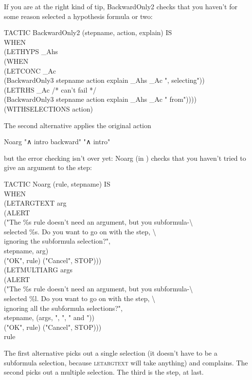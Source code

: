 If you are at the right kind of tip, BackwardOnly2 checks that you haven't for some reason selected a hypothesis formula or two:
\begin{japeish}
TACTIC BackwardOnly2 (stepname, action, explain) IS \\
\tab WHEN \\
\tab \tab (LETHYPS \_Ahs \\
\tab \tab \tab (WHEN  \\
\tab \tab \tab \tab (LETCONC \_Ac \\
\tab \tab \tab \tab \tab (BackwardOnly3 stepname action explain \_Ahs \_Ac ", selecting"))  \\
\tab \tab \tab \tab (LETRHS \_Ac  /* can't fail */  \\
\tab \tab \tab \tab \tab (BackwardOnly3 stepname action explain \_Ahs \_Ac " from"))))  \\
\tab \tab (WITHSELECTIONS action)
\end{japeish}
The second alternative applies the original action 
\begin{japeish}
Noarg "∧ intro backward" "∧ intro"
\end{japeish}
but the error checking isn't over yet: Noarg (in ) checks that you haven't tried to give an argument to the step:
\begin{japeish}
TACTIC Noarg (rule, stepname) IS \\
\tab WHEN \\
\tab \tab (LETARGTEXT arg \\
\tab \tab \tab (ALERT \\
\tab \tab \tab \tab ("The \%s rule doesn't need an argument, but you subformula-{\textbackslash}\\
\tab \tab \tab \tab {\textbackslash}selected  \%s. Do you want to go on with the step, {\textbackslash} \\
\tab \tab \tab \tab {\textbackslash}ignoring the subformula selection?",  \\
\tab \tab \tab \tab stepname, arg) \\
\tab \tab \tab \tab ("OK", rule) ("Cancel", STOP))) \\
\tab \tab (LETMULTIARG args \\
\tab \tab \tab (ALERT  \\
\tab \tab \tab \tab ("The \%s rule doesn't need an argument, but you subformula-{\textbackslash} \\
\tab \tab \tab \tab {\textbackslash}selected \%l. Do you want to go on with the step, {\textbackslash} \\
\tab \tab \tab \tab {\textbackslash}ignoring all the subformula selections?",  \\
\tab \tab \tab \tab stepname, (args, ", ", " and ")) \\
\tab \tab \tab \tab ("OK", rule) ("Cancel", STOP))) \\
\tab \tab rule
\end{japeish}
The first alternative picks out a single selection (it doesn't have to be a subformula selection, because \textsc{letargtext} will take anything) and complains. The second picks out a multiple selection. The third is the step, at last.

